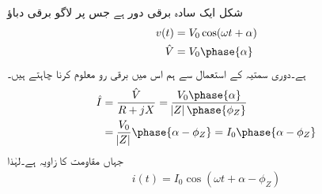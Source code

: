 شکل   ایک سادہ  برقی دور ہے جس پر لاگو برقی دباؤ
\begin{gather}
\begin{aligned}
v(t)&=V_0 \cos (\omega t +\alpha)\\
\hat{V}&=V_0 \phase{\alpha}
\end{aligned}
\end{gather}
ہے۔دوری سمتیہ کے استعمال سے ہم اس میں برقی رو  معلوم کرنا چاہتے ہیں۔
\begin{gather}
\begin{aligned}
\hat{I}&=\frac{\hat{V}}{R+j X}=\frac{V_0 \phase{\alpha}}{\abs{Z} \phase {\phi_Z}}\\
&=\frac{V_0}{\abs{Z}} \phase{\alpha-\phi_Z}=I_0 \phase{\alpha-\phi_Z}
\end{aligned}
\end{gather}
جہاں  مقاومت کا زاویہ  ہے۔لہٰذا
\begin{align}
i(t)=I_0 \cos (\omega t +\alpha-\phi_Z)
\end{align}

